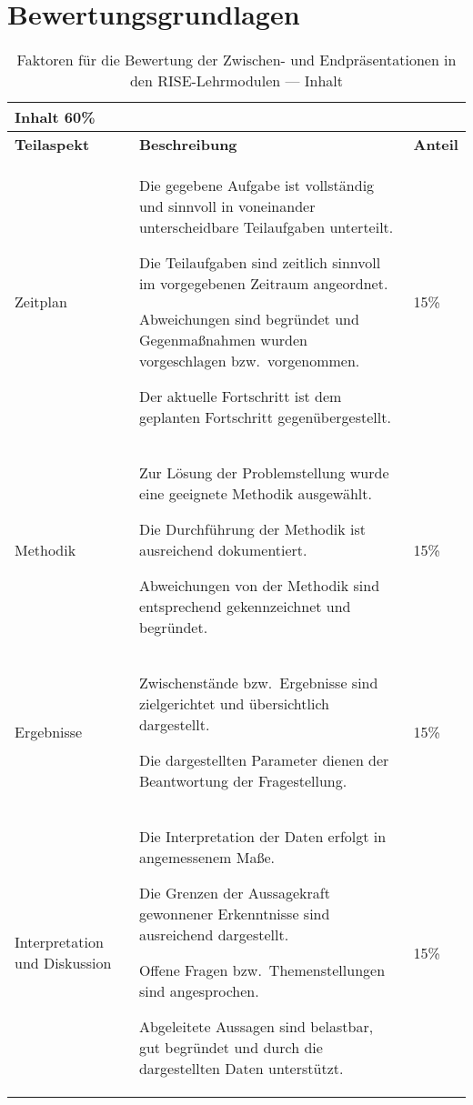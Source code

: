 \section{Bewertungsgrundlagen}

\renewcommand{\arraystretch}{1.2}
\setlength{\tabcolsep}{6pt}

\begin{table}[htbp]
\centering
\caption{Faktoren für die Bewertung der Zwischen- und Endpräsentationen in den RISE-Lehrmodulen — Inhalt}
\vspace{0.2cm}
\begin{tabular}{|p{}|p{}|p{}|}
\hline
\multicolumn{3}{|l|}{\textbf{Inhalt \hfill 60\%}}\\ \hline
\textbf{Teilaspekt} & \textbf{Beschreibung} & \textbf{Anteil}\\ \hline

Zeitplan &
{\raggedright
Die gegebene Aufgabe ist vollständig und sinnvoll in voneinander unterscheidbare Teilaufgaben unterteilt.\par
Die Teilaufgaben sind zeitlich sinnvoll im vorgegebenen Zeitraum angeordnet.\par
Abweichungen sind begründet und Gegenmaßnahmen wurden vorgeschlagen bzw.\ vorgenommen.\par
Der aktuelle Fortschritt ist dem geplanten Fortschritt gegenübergestellt.\par
}
& 15\% \\ \hline

Methodik &
{\raggedright
Zur Lösung der Problemstellung wurde eine geeignete Methodik ausgewählt.\par
Die Durchführung der Methodik ist ausreichend dokumentiert.\par
Abweichungen von der Methodik sind entsprechend gekennzeichnet und begründet.\par
}
& 15\% \\ \hline

Ergebnisse &
{\raggedright
Zwischenstände bzw.\ Ergebnisse sind zielgerichtet und übersichtlich dargestellt.\par
Die dargestellten Parameter dienen der Beantwortung der Fragestellung.\par
}
& 15\% \\ \hline

Interpretation und Diskussion &
{\raggedright
Die Interpretation der Daten erfolgt in angemessenem Maße.\par
Die Grenzen der Aussagekraft gewonnener Erkenntnisse sind ausreichend dargestellt.\par
Offene Fragen bzw.\ Themenstellungen sind angesprochen.\par
Abgeleitete Aussagen sind belastbar, gut begründet und durch die dargestellten Daten unterstützt.\par
}
& 15\% \\ \hline
\end{tabular}
\end{table}

